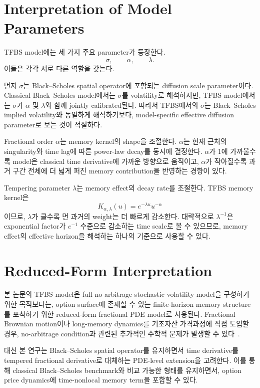 \documentclass[11pt,a4paper]{report}
\begin{document}
\section{Interpretation of Model Parameters}

TFBS model에는 세 가지 주요 parameter가 등장한다.
\[
\sigma,\qquad \alpha,\qquad \lambda.
\]
이들은 각각 서로 다른 역할을 갖는다.

먼저 $\sigma$는 Black--Scholes spatial operator에 포함되는 diffusion scale parameter이다. Classical Black--Scholes model에서는 $\sigma$를 volatility로 해석하지만, TFBS model에서는 $\sigma$가 $\alpha$ 및 $\lambda$와 함께 jointly calibrated된다. 따라서 TFBS에서의 $\sigma$는 Black--Scholes implied volatility와 동일하게 해석하기보다, model-specific effective diffusion parameter로 보는 것이 적절하다.

Fractional order $\alpha$는 memory kernel의 shape을 조절한다. $\alpha$는 현재 근처의 singularity와 time lag에 따른 power-law decay를 동시에 결정한다. $\alpha$가 1에 가까울수록 model은 classical time derivative에 가까운 방향으로 움직이고, $\alpha$가 작아질수록 과거 구간 전체에 더 넓게 퍼진 memory contribution을 반영하는 경향이 있다.

Tempering parameter $\lambda$는 memory effect의 decay rate를 조절한다. TFBS memory kernel은
\[
K_{\alpha,\lambda}(u)
=
e^{-\lambda u}u^{-\alpha}
\]
이므로, $\lambda$가 클수록 먼 과거의 weight는 더 빠르게 감소한다. 대략적으로 $\lambda^{-1}$은 exponential factor가 $e^{-1}$ 수준으로 감소하는 time scale로 볼 수 있으므로, memory effect의 effective horizon을 해석하는 하나의 기준으로 사용할 수 있다.

\section{Reduced-Form Interpretation}

본 논문의 TFBS model은 full no-arbitrage stochastic volatility model을 구성하기 위한 목적보다는, option surface에 존재할 수 있는 finite-horizon memory structure를 포착하기 위한 reduced-form fractional PDE model로 사용된다. Fractional Brownian motion이나 long-memory dynamics를 기초자산 가격과정에 직접 도입할 경우, no-arbitrage condition과 관련된 추가적인 수학적 문제가 발생할 수 있다~\cite{Cheridito2003}.

대신 본 연구는 Black--Scholes spatial operator를 유지하면서 time derivative를 tempered fractional derivative로 대체하는 PDE-level extension을 고려한다. 이를 통해 classical Black--Scholes benchmark와 비교 가능한 형태를 유지하면서, option price dynamics에 time-nonlocal memory term을 포함할 수 있다.
\end{document}
